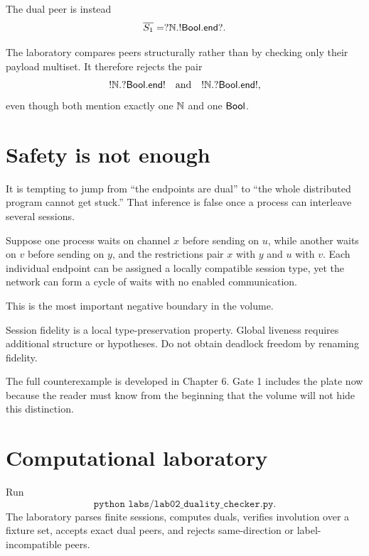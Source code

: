 The dual peer is instead
\[
\overline{S_1}=?\mathbb{N}.!\mathsf{Bool}.\mathsf{end?}.
\]

\begin{workedexample}
The laboratory compares peers structurally rather than by checking only their payload multiset.
It therefore rejects the pair
\[
 !\mathbb{N}.?\mathsf{Bool}.\mathsf{end!}
 \quad\text{and}\quad
 !\mathbb{N}.?\mathsf{Bool}.\mathsf{end!},
\]
even though both mention exactly one \(\mathbb{N}\) and one \(\mathsf{Bool}\).
\end{workedexample}

\section{Safety is not enough}

It is tempting to jump from ``the endpoints are dual'' to ``the whole distributed program cannot
get stuck.'' That inference is false once a process can interleave several sessions.

Suppose one process waits on channel \(x\) before sending on \(u\), while another waits on \(v\)
before sending on \(y\), and the restrictions pair \(x\) with \(y\) and \(u\) with \(v\).
Each individual endpoint can be assigned a locally compatible session type, yet the network can
form a cycle of waits with no enabled communication.



This is the most important negative boundary in the volume.

\begin{principle}
Session fidelity is a local type-preservation property. Global liveness requires additional
structure or hypotheses. Do not obtain deadlock freedom by renaming fidelity.
\end{principle}

The full counterexample is developed in Chapter 6. Gate 1 includes the plate now because the
reader must know from the beginning that the volume will not hide this distinction.

\section{Computational laboratory}

\begin{labbox}
Run
\[
  \texttt{python labs/lab02_duality_checker.py}.
\]
The laboratory parses finite sessions, computes duals, verifies involution over a fixture set,
accepts exact dual peers, and rejects same-direction or label-incompatible peers.
\end{labbox}


